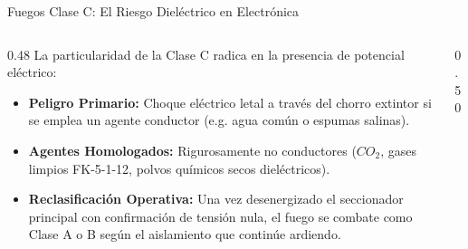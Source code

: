 \begin{frame}{Fuegos Clase C: El Riesgo Dieléctrico en Electrónica}
  \begin{columns}[c]
    \begin{column}{0.48\textwidth}
      \small
      La particularidad de la Clase C radica en la presencia de potencial eléctrico:
      \begin{itemize}
        \scriptsize
        \item \textbf{Peligro Primario:} Choque eléctrico letal a través del chorro extintor si se emplea un agente conductor (e.g. agua común o espumas salinas).
        \item \textbf{Agentes Homologados:} Rigurosamente no conductores ($CO_2$, gases limpios FK-5-1-12, polvos químicos secos dieléctricos).
        \item \textbf{Reclasificación Operativa:} Una vez desenergizado el seccionador principal con confirmación de tensión nula, el fuego se combate como Clase A o B según el aislamiento que continúe ardiendo.
      \end{itemize}
    \end{column}

    \begin{column}{0.50\textwidth}
      \centering
    \end{column}
  \end{columns}
\end{frame}

